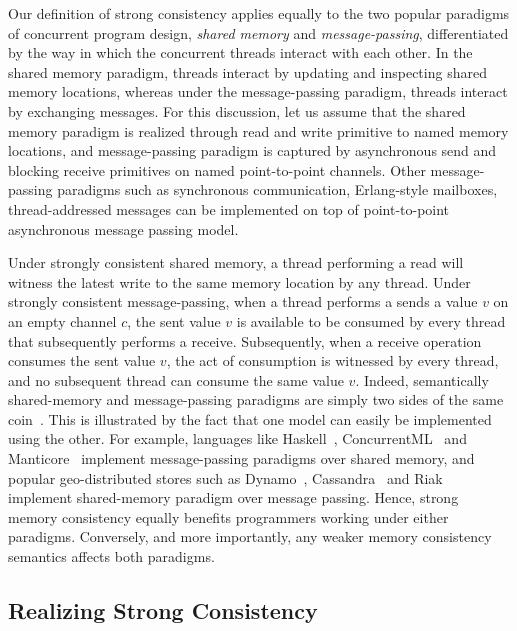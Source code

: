 Our definition of strong consistency applies equally to the two popular
paradigms of concurrent program design, \emph{shared memory} and
\emph{message-passing}, differentiated by the way in which the concurrent
threads interact with each other. In the shared memory paradigm, threads
interact by updating and inspecting shared memory locations, whereas under the
message-passing paradigm, threads interact by exchanging messages. For this
discussion, let us assume that the shared memory paradigm is realized through
read and write primitive to named memory locations, and message-passing
paradigm is captured by asynchronous send and blocking receive primitives on
named point-to-point channels. Other message-passing paradigms such as
synchronous communication, Erlang-style mailboxes, thread-addressed messages
can be implemented on top of point-to-point asynchronous message passing model.

Under strongly consistent shared memory, a thread performing a read will
witness the latest write to the same memory location by any thread. Under
strongly consistent message-passing, when a thread performs a sends a value $v$
on an empty channel $c$, the sent value $v$ is available to be consumed by
every thread that subsequently performs a receive. Subsequently, when a receive
operation consumes the sent value $v$, the act of consumption is witnessed by
every thread, and no subsequent thread can consume the same value $v$. Indeed,
semantically shared-memory and message-passing paradigms are simply two sides
of the same coin~\cite{Turon2013,Lauer1979}. This is illustrated by the fact
that one model can easily be implemented using the other. For example,
languages like Haskell~\cite{haskellsm}, ConcurrentML~\cite{Reppy99} and
Manticore~\cite{Fluet2007} implement message-passing paradigms over shared
memory, and popular geo-distributed stores such as Dynamo~\cite{DeCandia2007},
Cassandra~\cite{Lakshman2010} and Riak~\cite{Riak} implement shared-memory
paradigm over message passing. Hence, strong memory consistency equally
benefits programmers working under either paradigms. Conversely, and more
importantly, any weaker memory consistency semantics affects both paradigms.

\subsection{Realizing Strong Consistency}

